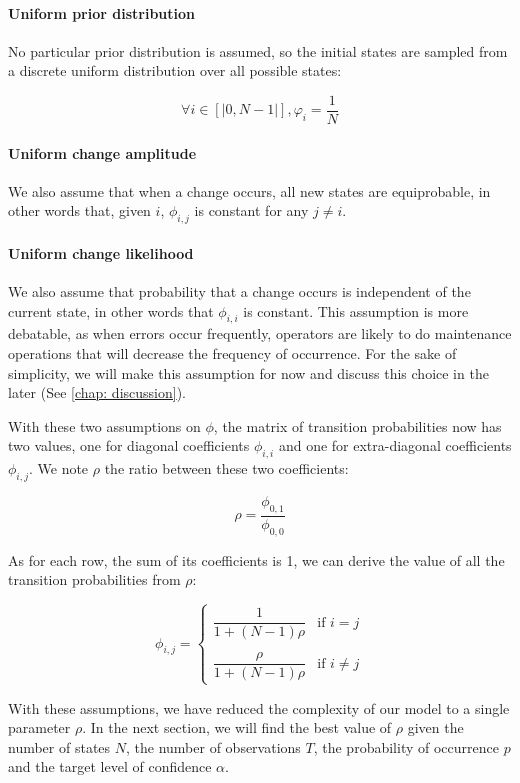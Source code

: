 \documentclass{kththesis}
\begin{document}
\paragraph{Uniform prior distribution}
No particular prior distribution is assumed, so the initial states are sampled from a discrete uniform distribution over all possible states:

$$\forall i \in [|0, N-1|], \varphi_i = \dfrac{1}{N}$$

\paragraph{Uniform change amplitude}
We also assume that when a change occurs, all new states are equiprobable, in other words that, given $i$, $\phi_{i,j}$ is constant for any $j \neq i$. 

\paragraph{Uniform change likelihood}
We also assume that probability that a change occurs is independent of the current state, in other words that $\phi_{i,i}$ is constant. This assumption is more debatable, as when errors occur frequently, operators are likely to do maintenance operations that will decrease the frequency of occurrence. For the sake of simplicity, we will make this assumption for now and discuss this choice in the later (See \ref{chap: discussion}).

With these two assumptions on $\phi$, the matrix of transition probabilities now has two values, one for diagonal coefficients $\phi_{i,i}$ and one for extra-diagonal coefficients $\phi_{i,j}$. We note $\rho$ the ratio between these two coefficients:

$$\rho = \dfrac{\phi_{0,1}}{\phi_{0,0}}$$

As for each row, the sum of its coefficients is 1, we can derive the value of all the transition probabilities from $\rho$:

$$
\phi_{i,j} = \left\{
\begin{array}{ll}
\dfrac{1}{1 + (N-1) \rho} & \text{if } i = j  \\
&\\
\dfrac{\rho}{1 + (N-1) \rho} & \text{if } i \neq j
 \end{array}\right.
$$

With these assumptions, we have reduced the complexity of our model to a single parameter $\rho$. In the next section, we will find the best value of $\rho$ given the number of states $N$, the number of observations $T$, the probability of occurrence $p$ and the target level of confidence $\alpha$.
\end{document}
